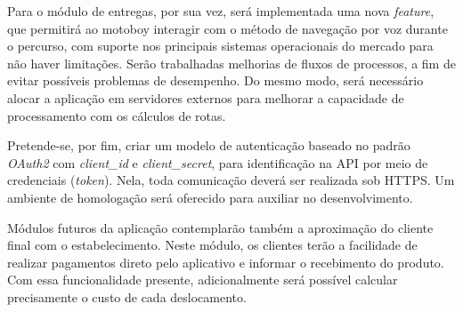 Para o módulo de entregas, por sua vez, será implementada uma nova \textit{feature}, que permitirá ao motoboy interagir com o método de navegação por voz durante o percurso, com suporte nos principais sistemas operacionais do mercado para não haver limitações. Serão trabalhadas melhorias de fluxos de processos, a fim de evitar possíveis problemas de desempenho. Do mesmo modo, será necessário alocar a aplicação em servidores externos para melhorar a capacidade de processamento com os cálculos de rotas.

Pretende-se, por fim, criar um modelo de autenticação baseado no padrão \textit{OAuth2} com \textit{client\_id} e \textit{client\_secret}, para identificação na API por meio de credenciais (\textit{token}). Nela, toda comunicação deverá ser realizada sob HTTPS. Um ambiente de homologação será oferecido para auxiliar no desenvolvimento.

Módulos futuros da aplicação contemplarão também a aproximação do cliente final com o estabelecimento. Neste módulo, os clientes terão a facilidade de realizar pagamentos direto pelo aplicativo e informar o recebimento do produto. Com essa funcionalidade presente, adicionalmente será possível calcular precisamente o custo de cada deslocamento.